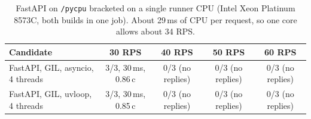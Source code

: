 \begin{table}[t]
\caption{FastAPI on \texttt{/pycpu} bracketed on a single runner CPU (Intel Xeon Platinum 8573C, both builds in one job). About 29\,ms of CPU per request, so one core allows about 34 RPS.}
\label{tab:bracket}
\centering\small
\begin{tabular}{lcccc}
\toprule
Candidate & 30 RPS & 40 RPS & 50 RPS & 60 RPS \\
\midrule
FastAPI, GIL, asyncio, 4 threads & 3/3, 30\,ms, 0.86\,c & 0/3 (no replies) & 0/3 (no replies) & 0/3 (no replies) \\
FastAPI, GIL, uvloop, 4 threads & 3/3, 30\,ms, 0.85\,c & 0/3 (no replies) & 0/3 (no replies) & 0/3 (no replies) \\
\bottomrule
\end{tabular}
\end{table}
